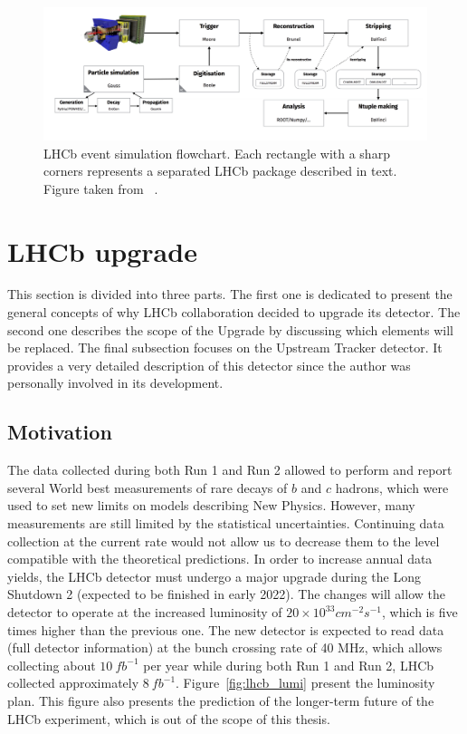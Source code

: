 \begin{figure}[!h]
\centering
\includegraphics[angle =-90]{figures/LHCb_simulation.PNG}
\caption{LHCb event simulation flowchart. Each rectangle with a sharp corners represents a separated LHCb package described in text. Figure taken from ~\cite{lhcb_computing}.
\label{fig:lhcb_sim}}
\end{figure}



\section{LHCb upgrade}
This section is divided into three parts. The first one is dedicated to present the general concepts of why LHCb collaboration decided to upgrade its detector. The second one describes the scope of the Upgrade by discussing which elements will be replaced. The final subsection focuses on the Upstream Tracker detector. It provides a very detailed description of this detector since the author was personally involved in its development.  

\subsection{Motivation}

The data collected during both Run 1 and Run 2 allowed to perform and report several World best measurements of rare decays of $b$ and $c$ hadrons, which were used to set new limits on models describing New Physics. However, many measurements are still limited by the statistical uncertainties. Continuing data collection at the current rate would not allow us to decrease them to the level compatible with the theoretical predictions. In order to increase annual data yields, the LHCb detector must undergo a major upgrade during the Long Shutdown 2 (expected to be finished in early 2022).  The changes will allow the detector to operate at the increased luminosity of $20 \times 10^{33} cm^{-2}s^{-1}$, which is five times higher than the previous one. The new detector is expected to read data (full detector information) at the bunch crossing rate of 40 MHz, which allows collecting about $10~ fb^{-1}$ per year while during both Run 1 and Run 2, LHCb collected approximately $8~ fb^{-1}$. Figure~\ref{fig:lhcb_lumi} present the luminosity plan. This figure also presents the prediction of the longer-term future of the LHCb experiment, which is out of the scope of this thesis.  

